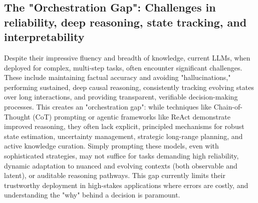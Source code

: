 \documentclass[11pt]{article}
\begin{document}
\subsection{The "Orchestration Gap": Challenges in reliability, deep reasoning, state tracking, and interpretability}
\label{sec:intro_orchestration_gap}
Despite their impressive fluency and breadth of knowledge, current LLMs, when deployed for complex, multi-step tasks, often encounter significant challenges. These include maintaining factual accuracy and avoiding "hallucinations," performing sustained, deep causal reasoning, consistently tracking evolving states over long interactions, and providing transparent, verifiable decision-making processes. This creates an "orchestration gap": while techniques like Chain-of-Thought (CoT) prompting \citep{Wei2022ChainOT} or agentic frameworks like ReAct \citep{Yao2022ReActSL} demonstrate improved reasoning, they often lack explicit, principled mechanisms for robust state estimation, uncertainty management, strategic long-range planning, and active knowledge curation. Simply prompting these models, even with sophisticated strategies, may not suffice for tasks demanding high reliability, dynamic adaptation to nuanced and evolving contexts (both observable and latent), or auditable reasoning pathways. This gap currently limits their trustworthy deployment in high-stakes applications where errors are costly, and understanding the "why" behind a decision is paramount.
\end{document}
